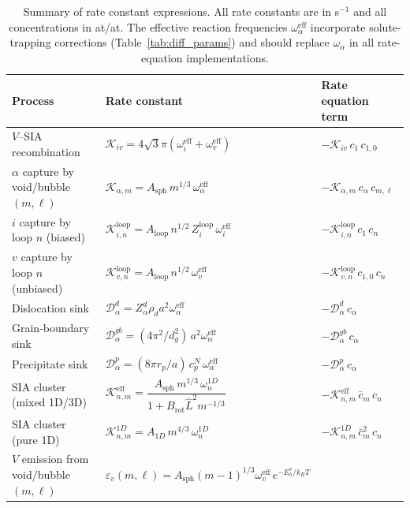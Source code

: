 \begin{table}[htbp]
\centering
\caption{Summary of rate constant expressions. All rate constants are in
s$^{-1}$ and all concentrations in at/at. The effective reaction frequencies
$\omega_\alpha^{\mathrm{eff}}$ incorporate solute-trapping corrections
(Table~\ref{tab:diff_params}) and should replace $\omega_\alpha$ in all
rate-equation implementations.}
\label{tab:rate_summary}
\renewcommand{\arraystretch}{1.3}
\begin{tabular}{@{}lll@{}}
\toprule
\textbf{Process} & \textbf{Rate constant} & \textbf{Rate equation term} \\
\midrule
$V$--SIA recombination
  & $\mathcal{K}_{iv} = 4\sqrt{3}\pi(\omega_i^{\mathrm{eff}}+\omega_v^{\mathrm{eff}})$
  & $-\mathcal{K}_{iv}\,c_1\,c_{1,0}$ \\[3pt]
$\alpha$ capture by void/bubble $(m,\ell)$
  & $\mathcal{K}_{\alpha,m} = A_{\mathrm{sph}}\,m^{1/3}\,\omega_\alpha^{\mathrm{eff}}$
  & $-\mathcal{K}_{\alpha,m}\,c_\alpha\,c_{m,\ell}$ \\[3pt]
$i$ capture by loop $n$ (biased)
  & $\mathcal{K}_{i,n}^{\mathrm{loop}} = A_{\mathrm{loop}}\,n^{1/2}\,Z_i^{\mathrm{loop}}\,\omega_i^{\mathrm{eff}}$
  & $-\mathcal{K}_{i,n}^{\mathrm{loop}}\,c_1\,c_n$ \\[3pt]
$v$ capture by loop $n$ (unbiased)
  & $\mathcal{K}_{v,n}^{\mathrm{loop}} = A_{\mathrm{loop}}\,n^{1/2}\,\omega_v^{\mathrm{eff}}$
  & $-\mathcal{K}_{v,n}^{\mathrm{loop}}\,c_{1,0}\,c_n$ \\[3pt]
Dislocation sink
  & $\mathcal{D}_\alpha^d = Z_\alpha^d\rho_d a^2\omega_\alpha^{\mathrm{eff}}$
  & $-\mathcal{D}_\alpha^d\,c_\alpha$ \\[3pt]
Grain-boundary sink
  & $\mathcal{D}_\alpha^{gb} = (4\pi^2/d_g^2)\,a^2\omega_\alpha^{\mathrm{eff}}$
  & $-\mathcal{D}_\alpha^{gb}\,c_\alpha$ \\[3pt]
Precipitate sink
  & $\mathcal{D}_\alpha^p = (8\pi r_p/a)\,c_p^N\,\omega_\alpha^{\mathrm{eff}}$
  & $-\mathcal{D}_\alpha^p\,c_\alpha$ \\[3pt]
SIA cluster (mixed 1D/3D)
  & $\mathcal{K}_{n,m}^{\mathrm{eff}} = \dfrac{A_{\mathrm{sph}}\,m^{1/3}\,\omega_n^{1D}}
    {1 + B_{\mathrm{rot}}\hat{L}^2 m^{-1/3}}$
  & $-\mathcal{K}_{n,m}^{\mathrm{eff}}\,\bar{c}_m\,c_n$ \\[6pt]
SIA cluster (pure 1D)
  & $\mathcal{K}_{n,m}^{1D} = A_{1D}\,m^{4/3}\,\omega_n^{1D}$
  & $-\mathcal{K}_{n,m}^{1D}\,\bar{c}_m^2\,c_n$ \\[3pt]
$V$ emission from void/bubble $(m,\ell)$
  & $\varepsilon_v(m,\ell)=A_{\mathrm{sph}}(m-1)^{1/3}\omega_v^{\mathrm{eff}}\,e^{-E_b^v/k_BT}$

\end{tabular}
\end{table}

